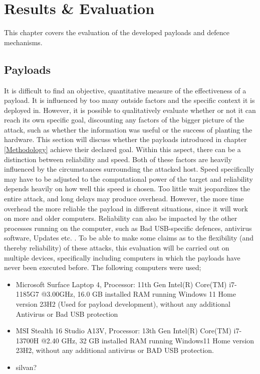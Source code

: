 \chapter{Results \& Evaluation} \label{Evaluation}

This chapter covers the evaluation of the developed payloads and defence mechanisms. 


\section{Payloads}

It is difficult to find an objective, quantitative measure of the effectiveness of a payload. It is influenced by too many outside factors and the specific context it is deployed in. However, it is possible to qualitatively evaluate whether or not it can reach its own specific goal, discounting any factors of the bigger picture of the attack, such as whether the information was useful or the success of planting the hardware. This section will discuss whether the payloads introduced in chapter \ref{Methodology} achieve their declared goal. Within this aspect, there can be a distinction between reliability and speed. Both of these factors are heavily influenced by the circumstances surrounding the attacked host. Speed specifically may have to be adjusted to the computational power of the target and reliability depends heavily on how well this speed is chosen. Too little wait jeopardizes the entire attack, and long delays may produce overhead. However, the more time overhead the more reliable the payload in different situations, since it will work on more and older computers. Reliability can also be impacted by the other processes running on the computer, such as Bad USB-specific defences, antivirus software, Updates etc. . To be able to make some claims as to the flexibility (and thereby reliability) of these attacks, this evaluation will be carried out on multiple devices, specifically including computers in which the payloads have never been executed before. The following computers were used;

\begin{itemize}
    \item Microsoft Surface Laptop 4, Processor: 11th Gen Intel(R) Core(TM) i7-1185G7 @3.00GHz, 16.0 GB installed RAM running Windows 11 Home version 23H2 (Used for payload development), without any additional Antivirus or Bad USB protection
    \item MSI Stealth 16 Studio A13V, Processor: 13th Gen Intel(R) Core(TM) i7-13700H @2.40 GHz, 32 GB installed RAM running Windows11 Home version 23H2, without any additional antivirus or BAD USB protection.
    \item silvan?
\end{itemize}
    
